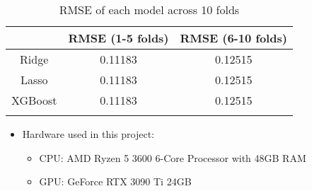 \documentclass[11pt,a4paper]{article}
\begin{document}
\begin{table}[h]
  \centering
  \begin{tabular}{c c c}
    \Xhline{2\arrayrulewidth}
            & RMSE (1-5 folds) & RMSE (6-10 folds) \\
    \hline
    Ridge   & 0.11183          & 0.12515           \\
    Lasso   & 0.11183          & 0.12515           \\
    XGBoost & 0.11183          & 0.12515           \\
    \Xhline{2\arrayrulewidth}
  \end{tabular}
  \caption{RMSE of each model across 10 folds}
\end{table}

\begin{itemize}
  \item Hardware used in this project:
        \begin{itemize}
          \item CPU: AMD Ryzen 5 3600 6-Core Processor with 48GB RAM
          \item GPU: GeForce RTX 3090 Ti 24GB
        \end{itemize}
\end{itemize}
\end{document}
